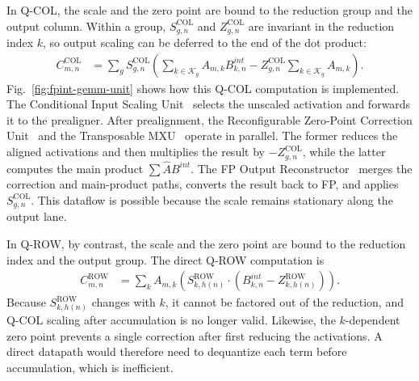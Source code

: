 \documentclass[sigconf,anonymous,nonacm]{acmart}
\newcommand{\qcol}{Q-COL}
\newcommand{\qrow}{Q-ROW}
\newcommand{\blackcircletext}[1]{%
  \tikz[baseline=-0.5ex]{
    \node[
      circle,
      fill=black,
      text=white,
      inner sep=0pt,
      minimum size=7pt,
      font=\fontsize{5}{5}\selectfont\bfseries
    ] (char) {#1};
  }%
}
\begin{document}
In \qcol{}, the scale and the zero point are bound to the reduction group and the output column. Within a group, $S^{\mathrm{COL}}_{g,n}$ and $Z^{\mathrm{COL}}_{g,n}$ are invariant in the reduction index $k$, so output scaling can be deferred to the end of the dot product:
\begin{align}
    C^{\mathrm{COL}}_{m,n}
    &=
    \sum_g S^{\mathrm{COL}}_{g,n}
    \left(
        \sum_{k \in \mathcal{K}_g} A_{m,k} B^{int}_{k,n}
        -
        Z^{\mathrm{COL}}_{g,n} \sum_{k \in \mathcal{K}_g} A_{m,k}
    \right) .
    \label{eq:qcol-fpint}
\end{align}
Fig.~\ref{fig:fpint-gemm-unit} shows how this \qcol{} computation is implemented. The Conditional Input Scaling Unit~\blackcircletext{1} selects the unscaled activation and forwards it to the prealigner. After prealignment, the Reconfigurable Zero-Point Correction Unit~\blackcircletext{2} and the Transposable MXU~\blackcircletext{3} operate in parallel. The former reduces the aligned activations and then multiplies the result by $-Z^{\mathrm{COL}}_{g,n}$, while the latter computes the main product $\sum \hat{A} B^{int}$. The FP Output Reconstructor~\blackcircletext{4} merges the correction and main-product paths, converts the result back to FP, and applies $S^{\mathrm{COL}}_{g,n}$. This dataflow is possible because the scale remains stationary along the output lane.

In \qrow{}, by contrast, the scale and the zero point are bound to the reduction index and the output group. The direct \qrow{} computation is
\begin{align}
    C^{\mathrm{ROW}}_{m,n}
    &=
    \sum_k A_{m,k}
    \left(
        S^{\mathrm{ROW}}_{k,h(n)} \cdot
        (B^{int}_{k,n} - Z^{\mathrm{ROW}}_{k,h(n)})
    \right) .
    \label{eq:qrow-direct}
\end{align}
Because $S^{\mathrm{ROW}}_{k,h(n)}$ changes with $k$, it cannot be factored out of the reduction, and \qcol{} scaling after accumulation is no longer valid. Likewise, the $k$-dependent zero point prevents a single correction after first reducing the activations. A direct datapath would therefore need to dequantize each term before accumulation, which is inefficient.
\end{document}
